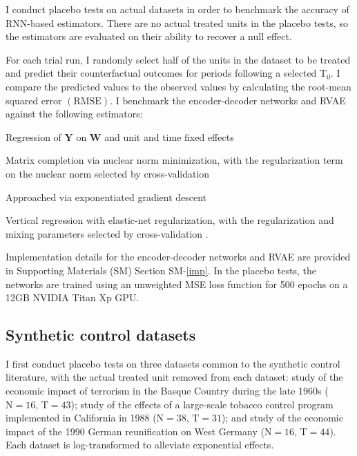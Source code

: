 I conduct placebo tests on actual datasets in order to benchmark the accuracy of RNN-based estimators. There are no actual treated units in the placebo tests, so the estimators are evaluated on their ability to recover a null effect. 

For each trial run, I randomly select half of the units in the dataset to be treated and predict their counterfactual outcomes for periods following a selected $\text{T}_0$. I compare the predicted values to the observed values by calculating the root-mean squared error $(\text{RMSE})$. I benchmark the encoder-decoder networks and RVAE against the following estimators: 
%
\begin{description}
	{\setlength\itemindent{1mm}
		\item[(a) DID] Regression of $\textbf{Y}$ on $\textbf{W}$ and unit and time fixed effects
		\item[(b) MC-NNM] Matrix completion via nuclear norm minimization, with the regularization term on the nuclear norm selected by cross-validation \citep{athey2017matrix}
		\item[(c) SCM] Approached via exponentiated gradient descent \citep{abadie2010synthetic}
		\item[(d) VT-EN] Vertical regression with elastic-net regularization, with the regularization and mixing parameters selected by cross-validation \citep{zou2005regularization,athey2017matrix}.
	}
\end{description}

Implementation details for the encoder-decoder networks and RVAE are provided in Supporting Materials (SM) Section SM-\ref{imp}. In the placebo tests, the networks are trained using an unweighted MSE loss function for 500 epochs on a 12GB NVIDIA Titan Xp GPU.

\subsection{Synthetic control datasets} \label{synth-placebo}

I first conduct placebo tests on three datasets common to the synthetic control literature, with the actual treated unit removed from each dataset:  study of the economic impact of terrorism in the Basque Country during the late 1960s ($\text{N}=16$, $\text{T}=43$);  study of the effects of a large-scale tobacco control program implemented in California in 1988 ($\text{N}=38$, $\text{T}=31$); and  study of the economic impact of the 1990 German reunification on West Germany ($\text{N}=16$, $\text{T}=44$). Each dataset is log-transformed to alleviate exponential effects.

